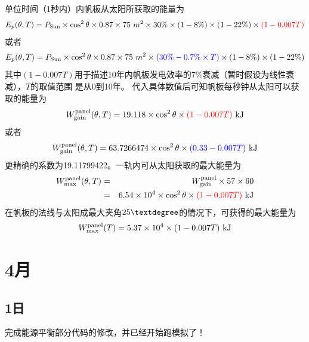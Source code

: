 单位时间（1秒内）内帆板从太阳所获取的能量为
\begin{eqnarray}
E_p(\theta,T) = P_{\rm Sun} \times \cos^2\theta\times 0.87 \times 75~m^2
         \times 30\% \times (1-8\%) \times (1-22\%) 
         \times \textcolor{red}{(1-0.007 T)}
\end{eqnarray}
或者
\begin{eqnarray}
E_p(\theta,T) = P_{\rm Sun} \times \cos^2\theta\times 0.87 \times 75~m^2
         \times \textcolor{blue}{(30\% - 0.7\% \times T)} \times (1-8\%) \times (1-22\%) 
\end{eqnarray}
其中$(1-0.007T)$用于描述10年内帆板发电效率的$7\%$衰减（暂时假设为线性衰减），$T$的取值范围
是从0到10年。
代入具体数值后可知帆板每秒钟从太阳可以获取的能量为
\begin{eqnarray}
W^{\rm panel}_{\rm gain}(\theta,T)
 = 19.118\times\cos^2\theta\times\textcolor{red}{(1-0.007T)}~{\rm kJ}
\end{eqnarray}
或者
\begin{eqnarray}
W^{\rm panel}_{\rm gain}(\theta,T)
 = 63.7266474\times\cos^2\theta\times\textcolor{blue}{(0.33-0.007T)}~{\rm kJ}
\end{eqnarray}
更精确的系数为19.11799422。一轨内可从太阳获取的最大能量为
\begin{eqnarray}
W^{\rm panel}_{\rm max}(\theta,T)
 &=& W^{\rm panel}_{\rm gain} \times 57 \times 60 \nonumber\\
 &=& 6.54 \times 10^4 \times\cos^2\theta\times\textcolor{red}{(1-0.007T)}~{\rm kJ}
\end{eqnarray}
在帆板的法线与太阳成最大夹角$25\textdegree$的情况下，可获得的最大能量为
\begin{eqnarray}
W^{\rm panel}_{\rm max}(T)
 = 5.37 \times 10^4 \times(1-0.007T)~{\rm kJ}
\end{eqnarray}



\section{4月}

\subsection{1日}
完成能源平衡部分代码的修改，并已经开始跑模拟了！

